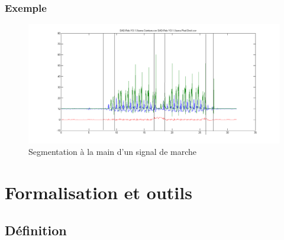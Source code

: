 \documentclass{beamer}
\begin{document}
\begin{frame}
	\frametitle{Exemple}
	\begin{figure}
		\includegraphics[scale=0.3]{exemple_seg.png}
		\caption{Segmentation à la main d'un signal de marche}
	\end{figure}
\end{frame}


		
		

\section{Formalisation et outils}

\subsection{Définition}
\end{document}
